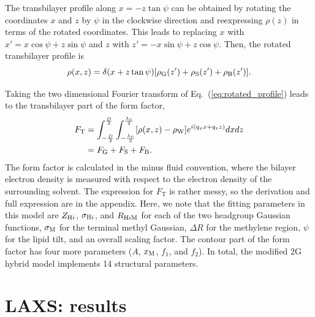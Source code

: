The transbilayer profile along $x=-z\tan\psi$ can be obtained by rotating
the coordinates $x$ and $z$ by $\psi$ in the clockwise direction and
reexpressing $\rho(z)$ in terms of the rotated coordinates. This leads
to replacing $x$ with $x'=x\cos\psi+z\sin\psi$ and
$z$ with $z'=-x\sin\psi+z\cos\psi$. Then, the rotated transbilayer profile is
\begin{equation}
  \rho(x,z) = \delta(x+z\tan\psi)\mathopen{}\left[ \rho_\mathrm{G}(z') + \rho_\mathrm{S}(z') + \rho_\mathrm{B}(z') \right]\mathclose{}.
  \label{eq:rotated_profile}
\end{equation}

Taking the two dimensional Fourier transform of Eq.~(\ref{eq:rotated_profile})
leads to the transbilayer part of the form factor,
\begin{align}
  F_\mathrm{T} 
  &= \int_{-\frac{D}{2}}^{\frac{D}{2}} \int_{-\frac{\lambda_r}{2}}^{\frac{\lambda_r}{2}} 
     \mathopen{}\left[ \rho(x,z)-\rho_\mathrm{W} \right]\mathclose{} e^{i(q_xx+q_zz)} dxdz \\
  &= F_\mathrm{G} + F_\mathrm{S} + F_\mathrm{B}.
\end{align}
The form factor is calculated in the minus fluid convention, 
where the bilayer electron density
is measured with respect to the electron density of the surrounding solvent.
The expression for $F_\mathrm{T}$ is rather messy, so 
the derivation and full expression are in the appendix. Here, 
we note that
the fitting parameters in this model are $Z_{\mathrm{H}i}$, $\sigma_{\mathrm{H}i}$, and 
$R_{\mathrm{H}i\mathrm{M}}$ for each of the two headgroup Gaussian functions, $\sigma_\mathrm{M}$ for
the terminal methyl Gaussian, $\Delta R$ for the methylene region, $\psi$ for
the lipid tilt, and an overall scaling factor. The contour part of the 
form factor has four more parameters ($A$, $x_\textrm{M}$, $f_1$, and $f_2$).
In total, the modified 2G hybrid model implements 14 structural parameters.

\newpage
\section{LAXS: results}
